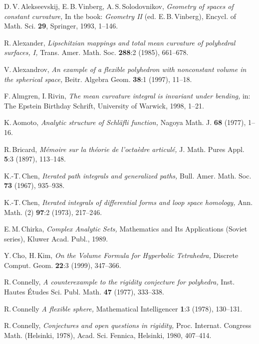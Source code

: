 \documentclass[reqno,tbtags,12pt]{amsart}
\numberwithin{equation}{section}
\theoremstyle{definition}
\begin{document}
\begin{thebibliography}{99}

 D.\,V.\,Alekseevskij, E.\,B.\,Vinberg, A.\,S.\,Solodovnikov, \textit{Geometry of spaces of constant curvature,} In the book: \textit{Geometry II} (ed. E.\,B.\,Vinberg), Encycl. of Math. Sci. \textbf{29}, Springer, 1993, 1--146. 

 R.\,Alexander, \textit{Lipschitzian mappings and total mean curvature of polyhedral surfaces, I,\/} Trans. Amer. Math. Soc. \textbf{288}:2 (1985), 661--678.

 V.\,Alexandrov, \textit{An example of a flexible polyhedron with nonconstant volume in the spherical space,} Beitr. Algebra Geom. \textbf{38}:1 (1997), 11--18.

 F.\,Almgren, I.\,Rivin, \textit{The mean curvature integral is invariant under bending,} in: The Epstein Birthday Schrift, University of Warwick, 1998, 1--21.

 K.\,Aomoto, \textit{Analytic structure of Schl\"afli function,} Nagoya Math. J. \textbf{68} (1977), 1--16.

 R.\,Bricard, \textit{M\'emoire sur la th\'eorie de l'octa\`edre articul\'e,} J. Math. Pures Appl. \textbf{5}:3 (1897), 113--148.

 K.-T.\,Chen, \textit{Iterated path integrals and generalized paths,} Bull. Amer. Math. Soc. \textbf{73} (1967), 935--938.

 K.-T.\,Chen, \textit{Iterated integrals of differential forms and loop space homology,} Ann. Math. (2) \textbf{97}:2 (1973), 217--246.

 E.\,M.\,Chirka, \textit{Complex Analytic Sets,} Mathematics and Its Applications (Soviet series),  Kluwer Acad. Publ., 1989.

 Y.\,Cho, H.\,Kim, \textit{On the Volume Formula for Hyperbolic Tetrahedra,} Discrete Comput. Geom. \textbf{22}:3 (1999), 347--366.

 R.\,Connelly, \textit{A counterexample to the rigidity conjecture for polyhedra,} Inst. Hautes \'Etudes Sci. Publ. Math. \textbf{47} (1977), 333--338.

 R.\,Connelly
\textit{A flexible sphere,}
Mathematical Intelligencer
\textbf{1}:3 (1978), 130--131.

 R.\,Connelly, \textit{Conjectures and open questions in rigidity,} Proc. Internat. Congress Math. (Helsinki, 1978), Acad. Sci. Fennica, Helsinki, 1980, 407--414.


\end{thebibliography}
\end{document}

